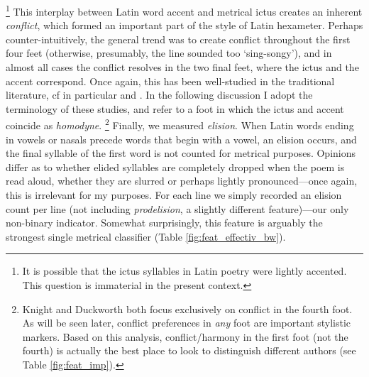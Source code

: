 \documentclass[11pt,a4paper]{scrartcl} %
\begin{document}
{\footnote{It is possible that the ictus syllables in Latin poetry were lightly accented. This question is immaterial in the present context.}
This interplay between Latin word accent and metrical ictus creates an inherent \textit{conflict}, which formed an important part of the style of Latin hexameter. Perhaps counter-intuitively, the general trend was to create conflict throughout the first four feet (otherwise, presumably, the line sounded too `sing-songy'), and in almost all cases the conflict resolves in the two final feet, where the ictus and the accent correspond. Once again, this has been well-studied in the traditional literature, cf in particular \cite{knight_homodyne_1931} and \citet[17-24]{duckworth_vergil_1969}. In the following discussion I adopt the terminology of these studies, and refer to a foot in which the ictus and accent coincide as \textit{homodyne}.%
\footnote{Knight and Duckworth both focus exclusively on conflict in the fourth foot. As will be seen later, conflict preferences in \textit{any} foot are important stylistic markers. Based on this analysis, conflict/harmony in the first foot (not the fourth) is actually the best place to look to distinguish different authors (see Table \ref{fig:feat_imp}).}
Finally, we measured \textit{elision}. When Latin words ending in vowels or nasals precede words that begin with a vowel, an elision occurs, and the final syllable of the first word is not counted for metrical purposes. Opinions differ as to whether elided syllables are completely dropped when the poem is read aloud, whether they are slurred or perhaps lightly pronounced---once again, this is irrelevant for my purposes. For each line we simply recorded an elision count per line (not including \textit{prodelision}, a slightly different feature)---our only non-binary indicator. Somewhat surprisingly, this feature is arguably the strongest single metrical classifier (Table \ref{fig:feat_effectiv_bw}).

}
\end{document}

